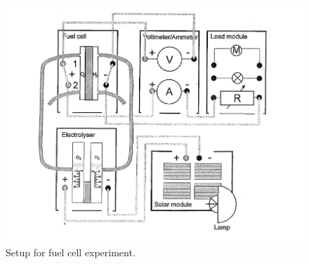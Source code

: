 \documentclass{article}
\begin{document}
    \begin{figure}
        \centering
        \includegraphics[scale=0.3]{./four.png}
        \caption{Setup for fuel cell experiment. \cite{SCE}}
    \end{figure}
    \newpage
\end{document}
